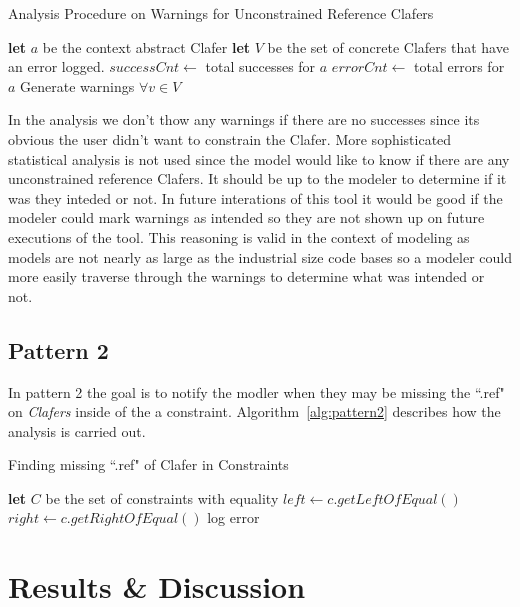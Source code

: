 \documentclass[10pt,oneside]{IEEEtran}
\begin{document}
\begin{algorithm}[H]
\caption{Analysis Procedure on Warnings for Unconstrained Reference Clafers}\label{alg:pattern1Stats}
\begin{algorithmic}[1]
  \State \textbf{let} $a$ be the context abstract Clafer
  \State \textbf{let} $V$ be the set of concrete Clafers that have an error logged.
  \State $successCnt \gets $ total successes for $a$
  \State $errorCnt \gets $ total errors for $a$
    \State Generate warnings $\forall v \in V$
  \EndIf
\EndProcedure
\end{algorithmic}
\end{algorithm}

In the analysis we don't thow any warnings if there are no successes since its obvious the user didn't want to constrain the Clafer. More sophisticated statistical analysis is not used since the model would like to know if there are any unconstrained reference Clafers. It should be up to the modeler to determine if it was they inteded or not. In future interations of this tool it would be good if the modeler could mark warnings as intended so they are not shown up on future executions of the tool. This reasoning is valid in the context of modeling as models are not nearly as large as the industrial size code bases so a modeler could more easily traverse through the warnings to determine what was intended or not.

\subsection{Pattern 2}
In pattern 2 the goal is to notify the modler when they may be missing the ``.ref" on  \textit{Clafers} inside of the a constraint. Algorithm~\ref{alg:pattern2} describes how the analysis is carried out.

\begin{algorithm}[H]
\caption{Finding missing ``.ref" of Clafer in Constraints}\label{alg:pattern2}
\begin{algorithmic}[1]
  \State \textbf{let} $C$ be the set of constraints with equality
    \State $left \gets c.getLeftOfEqual()$
    \State $right \gets c.getRightOfEqual()$
        \State log error
      \EndIf
    \EndIf
  \EndFor
\EndProcedure
\end{algorithmic}
\end{algorithm}

\section{Results \& Discussion}

\medskip

\printbibliography
\end{document}
